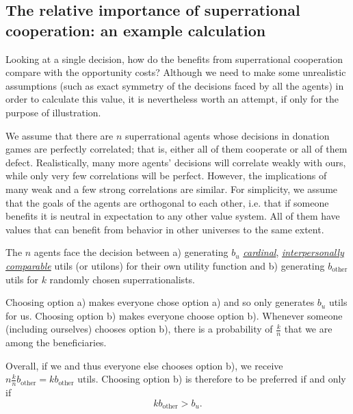 \hypertarget{the-relative-importance-of-superrational-cooperation-an-example-calculation}{\subsection{The
relative importance of superrational cooperation: an example
calculation}\label{the-relative-importance-of-superrational-cooperation-an-example-calculation}}

Looking at a single decision, how do the benefits from superrational
cooperation compare with the opportunity costs? Although we need to make
some unrealistic assumptions (such as exact symmetry of the decisions
faced by all the agents) in order to calculate this value, it is
nevertheless worth an attempt, if only for the purpose of illustration.

We assume that there are \(n\) superrational agents whose decisions in
donation games are perfectly correlated; that is, either all of them
cooperate or all of them defect. Realistically, many more agents'
decisions will correlate weakly with ours, while only very few
correlations will be perfect. However, the implications of many weak and
a few strong correlations are similar. For simplicity, we assume that
the goals of the agents are orthogonal to each other, i.e. that if
someone benefits it is neutral in expectation to any other value system.
All of them have values that can benefit from behavior in other
universes to the same extent.

The \(n\) agents face the decision between a) generating \(b_{u}\)
\href{https://en.wikipedia.org/wiki/Cardinal_utility}{\emph{cardinal}},
\href{https://en.wikipedia.org/wiki/Social_choice_theory\#Interpersonal_utility_comparison}{\emph{interpersonally
comparable}} utils (or utilons) for their own utility function and b)
generating \(b_{\text{other}}\) utils for \(k\) randomly chosen
superrationalists.

Choosing option a) makes everyone chose option a) and so only generates
\(b_{u}\) utils for us. Choosing option b) makes everyone choose option
b). Whenever someone (including ourselves) chooses option b), there is a
probability of \(\frac{k}{n}\) that we are among the beneficiaries.

Overall, if we and thus everyone else chooses option b), we receive \(n\frac{k}{n}b_{\text{other}} =
kb_{\text{other}}\) utils. Choosing option b) is therefore to be preferred if and only if
\begin{equation}
kb_{\text{other}} > b_{u}.
    \label{eq:preferred}
\end{equation}

